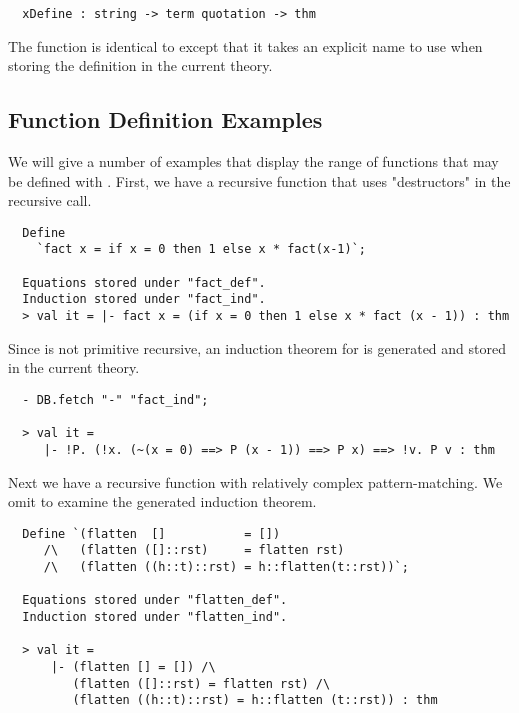 \begin{hol}
\begin{verbatim}
  xDefine : string -> term quotation -> thm
\end{verbatim}
\end{hol}
The  function is identical to
 except that it takes an explicit name to use when
storing the definition in the current theory. 

\subsection{Function Definition Examples}
 We will give a number of examples that display the range of functions
that may be defined with . First, we have a recursive function
that uses "destructors" in the recursive call. 
 
\begin{hol}
\begin{verbatim}
  Define 
    `fact x = if x = 0 then 1 else x * fact(x-1)`;

  Equations stored under "fact_def".
  Induction stored under "fact_ind".
  > val it = |- fact x = (if x = 0 then 1 else x * fact (x - 1)) : thm
\end{verbatim}
\end{hol}
%
Since  is not
primitive recursive, an induction theorem for  is generated and 
stored in the current theory.
%
\begin{hol}
\begin{verbatim}
  - DB.fetch "-" "fact_ind";
 
  > val it =
     |- !P. (!x. (~(x = 0) ==> P (x - 1)) ==> P x) ==> !v. P v : thm
\end{verbatim}
\end{hol}
 
Next we have a recursive function with relatively complex
pattern-matching. We omit to examine the generated induction
theorem.
%
\begin{hol}
\begin{verbatim}
  Define `(flatten  []           = [])
     /\   (flatten ([]::rst)     = flatten rst)
     /\   (flatten ((h::t)::rst) = h::flatten(t::rst))`;

  Equations stored under "flatten_def".
  Induction stored under "flatten_ind".

  > val it =
      |- (flatten [] = []) /\
         (flatten ([]::rst) = flatten rst) /\
         (flatten ((h::t)::rst) = h::flatten (t::rst)) : thm
\end{verbatim}
\end{hol}
 
